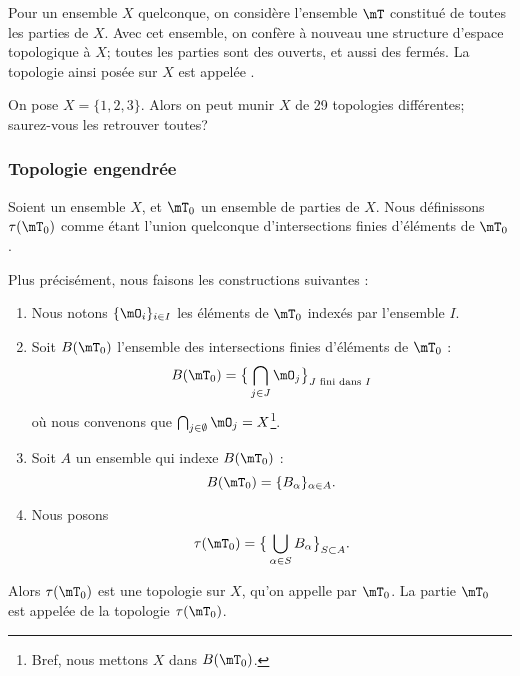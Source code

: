 \begin{example}\label{DefTopologieDiscrete}
	Pour un ensemble \( X \) quelconque, on considère l'ensemble \( \mT \) constitué de toutes les parties de \( X \). Avec cet ensemble, on confère à nouveau une structure d'espace topologique à \(X \); toutes les parties sont des ouverts, et aussi des fermés. La topologie ainsi posée sur \(X \) est appelée .
\end{example}

\begin{example}       \label{EXooLAOSooJtjJnu}
	On pose \( X = \{1, 2, 3\} \). Alors on peut munir \( X \) de 29 topologies différentes\cite{BIBooSLBZooRYtdIi}; saurez-vous les retrouver toutes?
\end{example}

\subsubsection{Topologie engendrée}

\begin{propositionDef}\label{DefTopologieEngendree}
	Soient un ensemble \( X \), et \( \mT_0 \) un ensemble de parties de \( X \). Nous définissons \( \tau(\mT_0)\) comme étant l'union quelconque d'intersections finies d'éléments de \( \mT_0 \).

	Plus précisément, nous faisons les constructions suivantes :
	\begin{enumerate}
		\item
		      Nous notons \( \{\mO_i \}_{i\in I}\) les éléments de \( \mT_0\) indexés par l'ensemble \( I\).
		\item
		      Soit  \( B(\mT_0)\) l'ensemble des intersections finies d'éléments de \( \mT_0\) :
		      \begin{equation}
			      B(\mT_0)=\big\{ \bigcap_{j\in J}\mO_j \big\}_{J\text{ fini dans }I}
		      \end{equation}
		      où nous convenons que \( \bigcap_{j\in\emptyset}\mO_j=X\)\footnote{Bref, nous mettons \( X\) dans \( B(\mT_0)\).}.
		\item
		      Soit \( A\) un ensemble qui indexe \(   B(\mT_0) \) :
		      \begin{equation}
			      B(\mT_0)=\{ B_{\alpha} \}_{\alpha\in A}.
		      \end{equation}
		\item
		      Nous posons
		      \begin{equation}
			      \tau(\mT_0)=\big\{    \bigcup_{\alpha\in S}B_{\alpha}   \big\}_{S\subset A}.
		      \end{equation}
	\end{enumerate}
	Alors \( \tau(\mT_0) \) est une topologie sur \(X\), qu'on appelle  par \( \mT_0 \). La partie \( \mT_0\) est appelée  de la topologie \(  \tau(\mT_0)  \).
\end{propositionDef}


